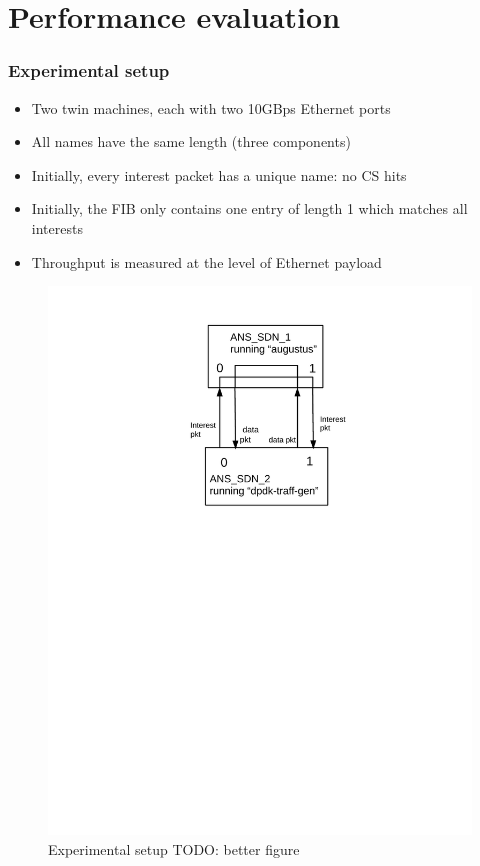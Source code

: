 \section{Performance evaluation}

\begin{frame}[fragile]
  \frametitle{Experimental setup}
  \begin{itemize}
    \item Two twin machines, each with two 10GBps Ethernet ports
    \item All names have the same length (three components)
    \item Initially, every interest packet has a unique name: no CS hits
    \item Initially, the FIB only contains one entry of length 1 which matches all interests
    \item Throughput is measured at the level of Ethernet payload
  \end{itemize}

  \begin{figure}
    \includegraphics[height=.5\textheight]{img/test_setup.pdf}
    \caption{Experimental setup {\tiny{TODO: better figure}}}
  \end{figure}
\end{frame}


